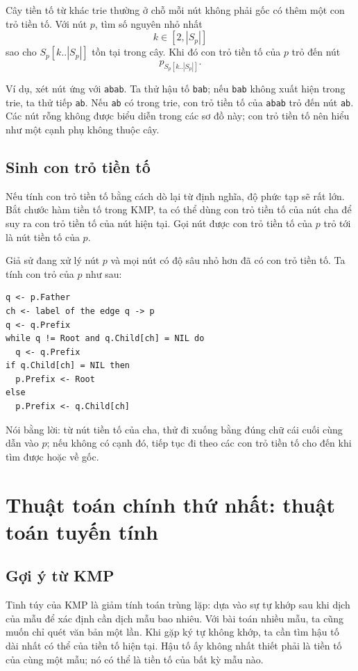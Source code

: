 \documentclass[11pt]{article}
\begin{document}
Cây tiền tố từ khác trie thường ở chỗ mỗi nút không phải gốc có thêm một con
trỏ tiền tố. Với nút $p$, tìm số nguyên nhỏ nhất
\[
  k\in[2,|S_p|]
\]
sao cho $S_p[k..|S_p|]$ tồn tại trong cây. Khi đó con trỏ tiền tố của $p$ trỏ
đến nút
\[
  p_{S_p[k..|S_p|]}.
\]

Ví dụ, xét nút ứng với \texttt{abab}. Ta thử hậu tố \texttt{bab}; nếu
\texttt{bab} không xuất hiện trong trie, ta thử tiếp \texttt{ab}. Nếu
\texttt{ab} có trong trie, con trỏ tiền tố của \texttt{abab} trỏ đến nút
\texttt{ab}. Các nút rỗng không được biểu diễn trong các sơ đồ này; con trỏ
tiền tố nên hiểu như một cạnh phụ không thuộc cây.

\subsection{Sinh con trỏ tiền tố}

Nếu tính con trỏ tiền tố bằng cách dò lại từ định nghĩa, độ phức tạp sẽ rất
lớn. Bắt chước hàm tiền tố trong KMP, ta có thể dùng con trỏ tiền tố của nút
cha để suy ra con trỏ tiền tố của nút hiện tại. Gọi nút được con trỏ tiền tố
của $p$ trỏ tới là nút tiền tố của $p$.

Giả sử đang xử lý nút $p$ và mọi nút có độ sâu nhỏ hơn đã có con trỏ tiền tố.
Ta tính con trỏ của $p$ như sau:

\begin{verbatim}
q <- p.Father
ch <- label of the edge q -> p
q <- q.Prefix
while q != Root and q.Child[ch] = NIL do
  q <- q.Prefix
if q.Child[ch] = NIL then
  p.Prefix <- Root
else
  p.Prefix <- q.Child[ch]
\end{verbatim}

Nói bằng lời: từ nút tiền tố của cha, thử đi xuống bằng đúng chữ cái cuối cùng
dẫn vào $p$; nếu không có cạnh đó, tiếp tục đi theo các con trỏ tiền tố cho
đến khi tìm được hoặc về gốc.

\section{Thuật toán chính thứ nhất: thuật toán tuyến tính}

\subsection{Gợi ý từ KMP}

Tinh túy của KMP là giảm tính toán trùng lặp: dựa vào sự tự khớp sau khi dịch
của mẫu để xác định cần dịch mẫu bao nhiêu. Với bài toán nhiều mẫu, ta cũng
muốn chỉ quét văn bản một lần. Khi gặp ký tự không khớp, ta cần tìm hậu tố
dài nhất có thể của tiền tố hiện tại. Hậu tố ấy không nhất thiết phải là tiền
tố của cùng một mẫu; nó có thể là tiền tố của bất kỳ mẫu nào.
\end{document}
